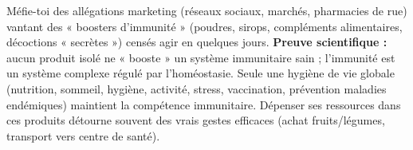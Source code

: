 \documentclass[11pt]{article}
\newcommand{\cle}[1]{{\popxbold\color{popdark}#1}}
\begin{document}
\begin{attention}
Méfie-toi des allégations marketing (réseaux sociaux, marchés, pharmacies de rue) vantant des « boosters d'immunité » (poudres, sirops, compléments alimentaires, décoctions « secrètes ») censés agir en quelques jours. \textbf{Preuve scientifique :} aucun produit isolé ne « booste » un système immunitaire sain ; l'immunité est un système complexe régulé par l'homéostasie. Seule une \cle{hygiène de vie globale} (nutrition, sommeil, hygiène, activité, stress, vaccination, prévention maladies endémiques) maintient la compétence immunitaire. Dépenser ses ressources dans ces produits détourne souvent des vrais gestes efficaces (achat fruits/légumes, transport vers centre de santé).
\end{attention}
\end{document}

